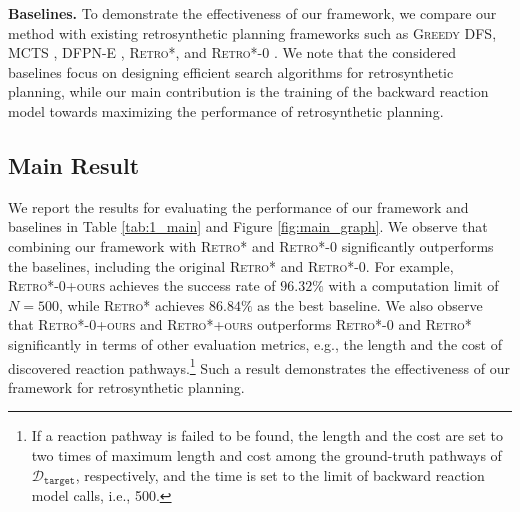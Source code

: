 \textbf{Baselines.}
To demonstrate the effectiveness of our framework, we compare our method with existing retrosynthetic planning frameworks such as \textsc{Greedy DFS}, \textsc{MCTS} \cite{segler2018planning}, \textsc{DFPN-E} \cite{kishimoto2019depth}, \textsc{Retro*}, and \textsc{Retro*-0} \cite{chen2020retro}. We note that the considered baselines focus on designing efficient search algorithms for retrosynthetic planning, while our main contribution is the training of the backward reaction model towards maximizing the performance of retrosynthetic planning. 





\subsection{Main Result}
We report the results for evaluating the performance of our framework and baselines in Table \ref{tab:1_main} and Figure \ref{fig:main_graph}. We observe that combining our framework with \textsc{Retro*} and \textsc{Retro*-0} significantly outperforms the baselines, including the original \textsc{Retro*} and \textsc{Retro*-0}. For example, \textsc{Retro*-0+ours} achieves the success rate of $96.32\%$ with a computation limit of $N=500$, while \textsc{Retro*} achieves $86.84\%$ as the best baseline. We also observe that \textsc{Retro*-0+ours} and \textsc{Retro*+ours} outperforms \textsc{Retro*-0} and \textsc{Retro*} significantly in terms of other evaluation metrics, e.g., the length and the cost of discovered reaction pathways.\footnote{If a reaction pathway is failed to be found, the length and the cost are set to two times of maximum length and cost among the ground-truth pathways of $\mathcal{D}_{\mathtt{target}}$, respectively, and the time is set to the limit of backward reaction model calls, i.e., 500.} Such a result demonstrates the effectiveness of our framework for retrosynthetic planning. 

